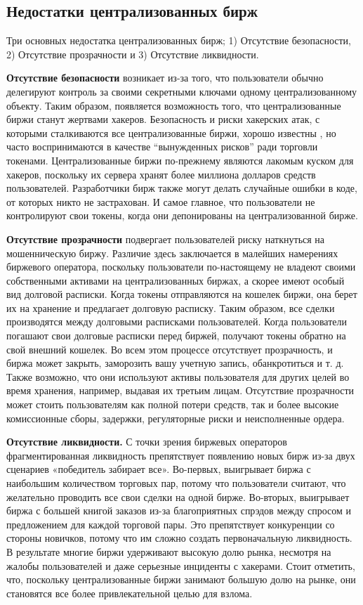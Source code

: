 \documentclass[utf8,nofonts]{article}
\begin{document}
\begin{multicols}{2}
	\subsection{Недостатки централизованных бирж}
	Три основных недостатка централизованных бирж; 1) Отсутствие безопасности, 2) Отсутствие прозрачности и 3) Отсутствие ликвидности.
	
	\textbf{Отсутствие безопасности} возникает из-за того, что пользователи обычно делегируют контроль за своими секретными ключами одному централизованному объекту. Таким образом, появляется возможность того, что централизованные биржи станут жертвами хакеров. Безопасность и риски хакерских атак, с которыми сталкиваются все централизованные биржи, хорошо известны \cite{coincheckhack}  \cite{mcmillan2014inside}, но часто воспринимаются в качестве \enquote{вынужденных рисков} ради торговли токенами. Централизованные биржи по-прежнему являются лакомым куском для хакеров, поскольку их сервера хранят более миллиона долларов средств пользователей. Разработчики бирж также могут делать случайные ошибки в коде, от которых никто не застрахован. И самое главное, что пользователи не контролируют свои токены, когда они депонированы на централизованной бирже.
	
	\textbf{Отсутствие прозрачности} подвергает пользователей риску наткнуться на мошенническую биржу. Различие здесь заключается в малейших намерениях биржевого оператора, поскольку пользователи по-настоящему не владеют своими собственными активами на централизованных биржах, а скорее имеют особый вид долговой расписки. Когда токены отправляются на кошелек биржи, она берет их на хранение и предлагает долговую расписку. Таким образом, все сделки производятся между долговыми расписками пользователей. Когда пользователи погашают свои долговые расписки перед биржей, получают токены обратно на свой внешний кошелек. Во всем этом процессе отсутствует прозрачность, и биржа может закрыть, заморозить вашу учетную запись, обанкротиться и т. д. Также возможно, что они используют активы пользователя для других целей во время хранения, например, выдавая их третьим лицам. Отсутствие прозрачности может стоить пользователям как полной потери средств, так и более высокие комиссионные сборы, задержки, регуляторные риски и неисполненные ордера.
	
	\textbf{Отсутствие ликвидности.} С точки зрения биржевых операторов фрагментированная ликвидность препятствует появлению новых бирж из-за двух сценариев «победитель забирает все». Во-первых, выигрывает биржа с наибольшим количеством торговых пар, потому что пользователи считают, что желательно проводить все свои сделки на одной бирже. Во-вторых, выигрывает биржа с большей книгой заказов из-за благоприятных спрэдов между спросом и предложением для каждой торговой пары. Это препятствует конкуренции со стороны новичков, потому что им сложно создать первоначальную ликвидность. В результате многие биржи удерживают высокую долю рынка, несмотря на жалобы пользователей и даже серьезные инциденты с хакерами. Стоит отметить, что, поскольку централизованные биржи занимают большую долю на рынке, они становятся все более привлекательной целью для взлома.
	

\end{multicols}
\end{document}
